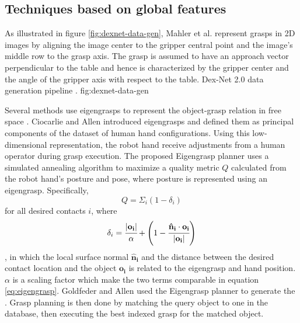 \subsection{Techniques based on global features}
As illustrated in figure \ref{fig:dexnet-data-gen}, Mahler et al. \cite{mahler2017} represent grasps in 2D images by
aligning the image center to the gripper central point and the image's middle row to the grasp axis. The grasp is
assumed to have an approach vector perpendicular to the table and hence is characterized by the gripper center and the
angle of the gripper axis with respect to the table.
             {Dex-Net 2.0 data generation pipeline \cite{mahler2017}.}
             {fig:dexnet-data-gen}{\textwidth}

Several methods use eigengrasps to represent the object-grasp relation in free space \cite{Goldfeder2011,Ciocarlie2009}.
Ciocarlie and Allen \cite{Ciocarlie2009} introduced eigengrasps and defined them as principal components of the dataset
of human hand configurations. Using this low-dimensional representation, the robot hand receive adjustments from a human
operator during grasp execution. The proposed Eigengrasp planner uses a simulated annealing algorithm to maximize a
quality metric $Q$ calculated from the robot hand's posture and pose, where posture is represented using an eigengrasp.
Specifically,
\begin{equation}
    Q = \Sigma_i (1 - \delta_i)
\end{equation}
for all desired contacts $i$, where
\begin{equation} \label{eq:eigengrasp}
    \delta_i = \cfrac{|\mathbf{o_i}|}{\alpha}
    + \left(1 - \cfrac{\mathbf{\hat{n}_i} \cdot \mathbf{o_i}}{|\mathbf{o_i}|} \right)
\end{equation}
, in which the local surface normal $\mathbf{\hat{n}_i}$ and the distance between the desired contact location and the
object $\mathbf{o_i}$ is related to the eigengrasp and hand position. $\alpha$ is a scaling factor which make the two
terms comparable in equation \ref{eq:eigengrasp}. Goldfeder and Allen \cite{Goldfeder2011} used the Eigengrasp planner
to generate the . Grasp planning is then done by
matching the query object to one in the database, then executing the best indexed grasp for the matched object.

